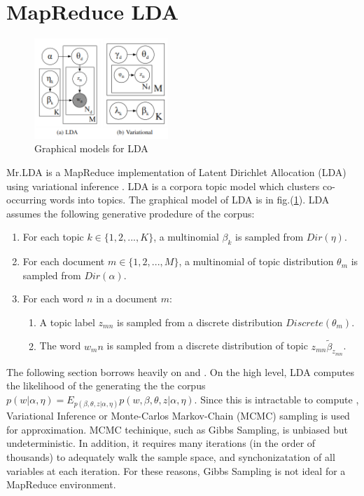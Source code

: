 \documentclass{acm_proc_article-sp}
\begin{document}
\section{MapReduce LDA}\label{sec:mrlda}
\begin{figure}[!htb]
 \centering
 \includegraphics[width=0.45\textwidth]{fig/eqn/lda-variational}
 \caption{Graphical models for LDA}\label{fig:ldagraphical}
\end{figure}

Mr.LDA is a MapReduce implementation of Latent Dirichlet Allocation (LDA) using variational inference \cite{mrlda}. LDA is a corpora topic model which clusters co-occurring words into topics. The graphical model of LDA is in fig.(\ref{fig:ldagraphical}). LDA assumes the following generative prodedure of the corpus:

\begin{enumerate}
\item For each topic $k \in \{1,2,...,K\}$, a multinomial $\beta_k$ is sampled from $Dir(\eta)$.
\item For each document $m \in \{1,2,...,M\}$, a multinomial of topic distribution $\theta_m$ is sampled from $Dir(\alpha)$.
\item For each word $n$ in a document $m$:
\begin{enumerate}
	\item A topic label $z_{mn}$ is sampled from a discrete distribution $Discrete(\theta_m)$.
	\item The word $w_mn$ is sampled from a discrete distribution of topic $z_{mn} \tilde \beta_{z_{mn}}$.
\end{enumerate}
\end{enumerate}

The following section borrows heavily on \cite{Blei03latentdirichlet} and \cite{mrlda}. On the high level, LDA computes the likelihood of the generating the the corpus $p(w | \alpha, \eta) = E_{p(\beta, \theta, z | \alpha, \eta)} p(w, \beta, \theta, z | \alpha, \eta)$. Since this is intractable to compute \cite{Blei03latentdirichlet}, Variational Inference or Monte-Carlos Markov-Chain (MCMC) sampling is used for approximation. MCMC techinique, such as Gibbs Sampling, is unbiased but undeterministic. In addition, it requires many iterations (in the order of thousands) to adequately walk the sample space, and synchonizatation of all variables at each iteration. For these reasons, Gibbs Sampling is not ideal for a MapReduce environment.
\end{document}
